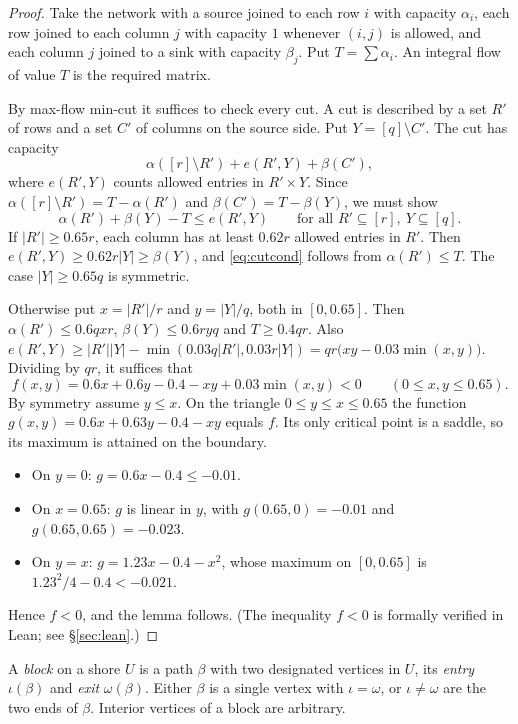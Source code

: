 \documentclass[11pt]{article}
\theoremstyle{definition}
\begin{document}
\begin{proof}
Take the network with a source joined to each row $i$ with capacity $\alpha_i$, each row joined to each column $j$ with capacity $1$ whenever $(i,j)$ is allowed, and each column $j$ joined to a sink with capacity $\beta_j$. Put $T=\sum\alpha_i$. An integral flow of value $T$ is the required matrix.

By max-flow min-cut it suffices to check every cut. A cut is described by a set $R'$ of rows and a set $C'$ of columns on the source side. Put $Y=[q]\setminus C'$. The cut has capacity
\[
\alpha([r]\setminus R')+e(R',Y)+\beta(C'),
\]
where $e(R',Y)$ counts allowed entries in $R'\times Y$. Since $\alpha([r]\setminus R')=T-\alpha(R')$ and $\beta(C')=T-\beta(Y)$, we must show
\begin{equation}\label{eq:cutcond}
\alpha(R')+\beta(Y)-T\le e(R',Y)\qquad\text{for all }R'\subseteq[r],\ Y\subseteq[q].
\end{equation}
If $|R'|\ge0.65r$, each column has at least $0.62r$ allowed entries in $R'$. Then $e(R',Y)\ge0.62r|Y|\ge\beta(Y)$, and \eqref{eq:cutcond} follows from $\alpha(R')\le T$. The case $|Y|\ge0.65q$ is symmetric.

Otherwise put $x=|R'|/r$ and $y=|Y|/q$, both in $[0,0.65]$. Then $\alpha(R')\le0.6qxr$, $\beta(Y)\le0.6ryq$ and $T\ge0.4qr$. Also $e(R',Y)\ge|R'||Y|-\min(0.03q|R'|,0.03r|Y|)=qr\bigl(xy-0.03\min(x,y)\bigr)$. Dividing by $qr$, it suffices that
\[
f(x,y)=0.6x+0.6y-0.4-xy+0.03\min(x,y)<0\qquad(0\le x,y\le0.65).
\]
By symmetry assume $y\le x$. On the triangle $0\le y\le x\le0.65$ the function $g(x,y)=0.6x+0.63y-0.4-xy$ equals $f$. Its only critical point is a saddle, so its maximum is attained on the boundary.
\begin{itemize}[nosep]
\item On $y=0$: $g=0.6x-0.4\le-0.01$.
\item On $x=0.65$: $g$ is linear in $y$, with $g(0.65,0)=-0.01$ and $g(0.65,0.65)=-0.023$.
\item On $y=x$: $g=1.23x-0.4-x^2$, whose maximum on $[0,0.65]$ is $1.23^2/4-0.4<-0.021$.
\end{itemize}
Hence $f<0$, and the lemma follows. (The inequality $f<0$ is formally verified in Lean; see \S\ref{sec:lean}.)
\end{proof}

A \emph{block} on a shore $U$ is a path $\beta$ with two designated vertices in $U$, its \emph{entry} $\iota(\beta)$ and \emph{exit} $\omega(\beta)$. Either $\beta$ is a single vertex with $\iota=\omega$, or $\iota\neq\omega$ are the two ends of $\beta$. Interior vertices of a block are arbitrary.
\end{document}
